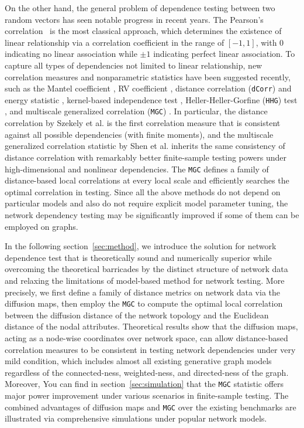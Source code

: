 \documentclass[11pt]{article}
\theoremstyle{definition}
\begin{document}
On the other hand, the general problem of dependence testing between two random vectors has seen notable progress in recent years. The Pearson's correlation~\cite{Pearson1895} is the most classical approach, which determines the existence of linear relationship via a correlation coefficient in the range of $[-1,1]$, with $0$ indicating no linear association while $\pm 1$ indicating perfect linear association. To capture all types of dependencies not limited to linear relationship, new correlation measures and nonparametric statistics have been suggested recently, such as the Mantel coefficient \cite{mantel1967}, RV coefficient \cite{RobertEscoufier1976}, distance correlation (\texttt{dCorr}) and energy statistic \cite{szekely2007measuring,szekelyRizzo2013a, RizzoSzekely2016}, kernel-based independence test \cite{GrettonGyorfi2010}, Heller-Heller-Gorfine (\texttt{HHG}) test \cite{HellerGorfine2013,heller2016consistent}, and multiscale generalized correlation (\texttt{MGC}) \cite{shen2016discovering}. In particular, the distance correlation by Szekely et al. \cite{szekely2007measuring} is the first correlation measure that is consistent against all possible dependencies (with finite moments), and the multiscale generalized correlation statistic by Shen et al. \cite{shen2016discovering} inherits the same consistency of distance correlation with remarkably better finite-sample testing powers under high-dimensional and nonlinear dependencies. The \texttt{MGC} defines a family of distance-based local correlations at every local scale and efficiently searches the optimal correlation in testing. Since all the above methods do not depend on particular models and also do not require explicit model parameter tuning, the network dependency testing may be significantly improved if some of them can be employed on graphs.

In the following section~\ref{sec:method}, we introduce the solution for network dependence test that is theoretically sound and numerically superior while overcoming the theoretical barricades by the distinct structure of network data and relaxing the limitations of model-based method for network testing. More precisely, we first define a family of distance metrics on network data via the diffusion maps, then employ the \texttt{MGC} to compute the optimal local correlation between the diffusion distance of the network topology and the Euclidean distance of the nodal attributes. Theoretical results show that the diffusion maps, acting as a node-wise coordinates over network space, can allow distance-based correlation measures to be consistent in testing network dependencies under very mild condition, which includes almost all existing generative graph models regardless of the connected-ness, weighted-ness, and directed-ness of the graph. Moreover, You can find in section~\ref{sec:simulation} that the \texttt{MGC} statistic offers major power improvement under various scenarios in finite-sample testing. The combined advantages of diffusion maps and \texttt{MGC} over the existing benchmarks are illustrated via comprehensive simulations under popular network models.
\end{document}
